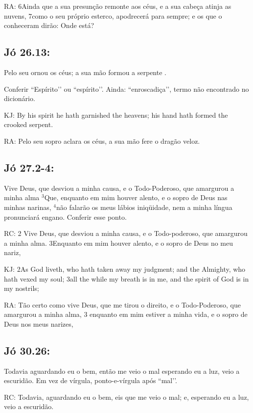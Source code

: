 RA: 6Ainda que a sua presunção remonte aos céus, e a sua cabeça atinja as nuvens, 7como o seu próprio esterco, apodrecerá para sempre; e os que o conheceram dirão: Onde está?

\subsection{Jó 26.13:}

 Pelo seu  ornou os céus; a sua mão formou a serpente .


Conferir ``Espírito’’ ou ``espírito’’. Ainda: ``enroscadiça’’, termo não encontrado no dicionário.

KJ: By his spirit he hath garnished the heavens; his hand hath formed the crooked serpent.

RA: Pelo seu sopro aclara os céus, a sua mão fere o dragão veloz.

\subsection{Jó 27.2-4:}

 Vive Deus, que desviou a minha causa, e o Todo-Poderoso, que amargurou a minha alma $^{\mathrm{3}}$Que, enquanto em mim houver alento, e o sopro de Deus nas minhas narinas, $^{\mathrm{4}}$não falarão os meus lábios iniqüidade, nem a minha língua pronunciará engano.
Conferir esse ponto.

RC: 2 Vive Deus, que desviou a minha causa, e o Todo-poderoso, que amargurou a minha alma. 3Enquanto em mim houver alento, e o sopro de Deus no meu nariz,

KJ: 2As God liveth, who hath taken away my judgment; and the Almighty, who hath vexed my soul; 3all the while my breath is in me, and the spirit of God is in my nostrils;

RA: Tão certo como vive Deus, que me tirou o direito, e o Todo-Poderoso, que amargurou a minha alma, 3 enquanto em mim estiver a minha vida, e o sopro de Deus nos meus narizes,

\subsection{Jó 30.26:}

 Todavia aguardando eu o bem, então me veio o mal\uwave{,} esperando eu a luz, veio a escuridão.
Em vez de vírgula, ponto-e-vírgula após ``mal’’.

RC: Todavia, aguardando eu o bem, eis que me veio o mal; e, esperando eu a luz, veio a escuridão.


